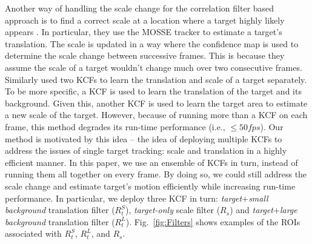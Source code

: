 \documentclass{bmvc2k}
\begin{document}
Another way of handling the scale change for the correlation filter
based approach is to find a correct scale at a location where a target
highly likely appears \cite{zhang2014fast}. In particular, they use
the MOSSE tracker to estimate a target's translation. The scale is
updated in a way where the confidence map is used to determine the
scale change between successive frames. This is because they assume
the scale of a target wouldn't change much over two consecutive
frames. Similarly \cite{ma2015long} used two KCFs to learn the
translation and scale of a target separately. To be more specific, a KCF
is used to learn the translation of the target and its
background. Given this, another KCF is used to learn the target area
to estimate a new scale of the target. However, because of running
more than a KCF on each frame, this method degrades its run-time
performance (i.e., $\leq 50 fps$). Our method is motivated by this
idea -- the idea of deploying multiple KCFs to address the issues of
single target tracking: scale and translation in a highly efficient manner. 
In this paper, we use an ensemble of KCFs in turn, instead of running them all together on
every frame. By doing so, we could still address the scale change and
estimate target's motion efficiently while increasing run-time
performance. In particular, we deploy three KCF in turn:
\textit{target}+\textit{small background} translation filter
($R_{t}^{S}$), \textit{target-only} scale filter ($R_{s}$) and
\textit{target}+\textit{large background} translation filter
($R_{t}^{L}$). Fig.~\ref{fig:Filters} shows examples of the ROIs
associated with $R_{t}^{S}$, $R_{t}^{L}$, and $R_{s}$.

\end{document}
